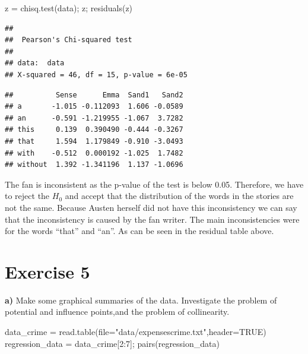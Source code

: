 \documentclass[
  10pt,
]{article}
\newenvironment{Shaded}{\begin{snugshade}}{\end{snugshade}}
\newcommand{\AttributeTok}[1]{\textcolor[rgb]{0.77,0.63,0.00}{#1}}
\newcommand{\ConstantTok}[1]{\textcolor[rgb]{0.00,0.00,0.00}{#1}}
\newcommand{\DecValTok}[1]{\textcolor[rgb]{0.00,0.00,0.81}{#1}}
\newcommand{\FunctionTok}[1]{\textcolor[rgb]{0.00,0.00,0.00}{#1}}
\newcommand{\NormalTok}[1]{#1}
\newcommand{\OtherTok}[1]{\textcolor[rgb]{0.56,0.35,0.01}{#1}}
\newcommand{\SpecialCharTok}[1]{\textcolor[rgb]{0.00,0.00,0.00}{#1}}
\newcommand{\StringTok}[1]{\textcolor[rgb]{0.31,0.60,0.02}{#1}}
\begin{document}
\begin{Shaded}
\begin{Highlighting}[]
\NormalTok{z }\OtherTok{=} \FunctionTok{chisq.test}\NormalTok{(data); z; }\FunctionTok{residuals}\NormalTok{(z)}
\end{Highlighting}
\end{Shaded}

\begin{verbatim}
## 
##  Pearson's Chi-squared test
## 
## data:  data
## X-squared = 46, df = 15, p-value = 6e-05
\end{verbatim}

\begin{verbatim}
##          Sense      Emma  Sand1   Sand2
## a       -1.015 -0.112093  1.606 -0.0589
## an      -0.591 -1.219955 -1.067  3.7282
## this     0.139  0.390490 -0.444 -0.3267
## that     1.594  1.179849 -0.910 -3.0493
## with    -0.512  0.000192 -1.025  1.7482
## without  1.392 -1.341196  1.137 -1.0696
\end{verbatim}

The fan is inconsistent as the p-value of the test is below 0.05.
Therefore, we have to reject the \(H_0\) and accept that the
distribution of the words in the stories are not the same. Because
Austen herself did not have this inconsistency we can say that the
inconsistency is caused by the fan writer. The main inconsistencies were
for the words ``that'' and ``an''. As can be seen in the residual table
above.

\hypertarget{exercise-5}{%
\section{Exercise 5}\label{exercise-5}}

\textbf{a)} Make some graphical summaries of the data. Investigate the
problem of potential and influence points,and the problem of
collinearity.

\begin{Shaded}
\begin{Highlighting}[]
\NormalTok{data\_crime }\OtherTok{=} \FunctionTok{read.table}\NormalTok{(}\AttributeTok{file=}\StringTok{"data/expensescrime.txt"}\NormalTok{,}\AttributeTok{header=}\ConstantTok{TRUE}\NormalTok{)}
\NormalTok{regression\_data }\OtherTok{=}\NormalTok{ data\_crime[}\DecValTok{2}\SpecialCharTok{:}\DecValTok{7}\NormalTok{]; }\FunctionTok{pairs}\NormalTok{(regression\_data)}
\end{Highlighting}
\end{Shaded}
\end{document}
